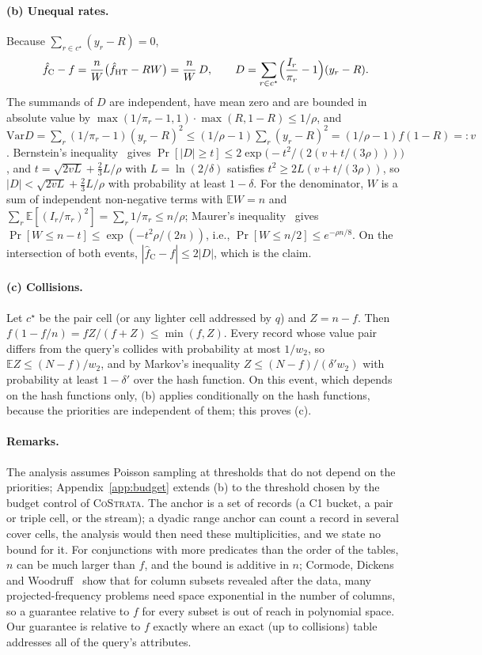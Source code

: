 \documentclass[sigconf,review,anonymous]{acmart}
\newcommand{\cs}{\textsc{CoStrata}\xspace}
\newcommand{\E}{\mathbb{E}}
\newcommand{\Var}{\mathrm{Var}}
\begin{document}
\paragraph{(b) Unequal rates.} Because $\sum_{r\in c^\star}(y_r-R)=0$,
\[
 \hat f_{\mathrm C}-f=\frac nW\bigl(\hat f_{\mathrm{HT}}-RW\bigr)=\frac nW\,D,\qquad
 D=\sum_{r\in c^\star}\Bigl(\frac{I_r}{\pi_r}-1\Bigr)(y_r-R).
\]
The summands of $D$ are independent, have mean zero and are bounded in absolute value by
$\max(1/\pi_r-1,1)\cdot\max(R,1-R)\le1/\rho$, and
$\Var D=\sum_r(1/\pi_r-1)(y_r-R)^2\le(1/\rho-1)\sum_r(y_r-R)^2=(1/\rho-1)f(1-R)=:v$. Bernstein's
inequality~\cite[Thm.~2.10]{concentration} gives $\Pr[|D|\ge t]\le2\exp\bigl(-t^2/(2(v+t/(3\rho)))\bigr)$,
and $t=\sqrt{2vL}+\frac23L/\rho$ with $L=\ln(2/\delta)$ satisfies $t^2\ge2L(v+t/(3\rho))$, so
$|D|<\sqrt{2vL}+\frac23L/\rho$ with probability at least $1-\delta$. For the denominator, $W$ is a sum of
independent non-negative terms with $\E W=n$ and $\sum_r\E[(I_r/\pi_r)^2]=\sum_r1/\pi_r\le n/\rho$;
Maurer's inequality~\cite{maurer} gives $\Pr[W\le n-t]\le\exp(-t^2\rho/(2n))$, i.e.,
$\Pr[W\le n/2]\le e^{-\rho n/8}$. On the intersection of both events, $|\hat f_{\mathrm C}-f|\le2|D|$,
which is the claim.

\paragraph{(c) Collisions.} Let $c^\star$ be the pair cell (or any lighter cell addressed by $q$) and
$Z=n-f$. Then $f(1-f/n)=fZ/(f+Z)\le\min(f,Z)$. Every record whose value pair differs from the query's
collides with probability at most $1/w_2$, so $\E Z\le(N-f)/w_2$, and by Markov's inequality
$Z\le(N-f)/(\delta'w_2)$ with probability at least $1-\delta'$ over the hash function. On this event,
which depends on the hash functions only, (b) applies conditionally on the hash functions, because the
priorities are independent of them; this proves (c).

\paragraph{Remarks.} The analysis assumes Poisson sampling at thresholds that do not depend on the
priorities; Appendix~\ref{app:budget} extends (b) to the threshold chosen by the budget control of \cs.
The anchor is a set of records (a C1 bucket, a pair or triple cell, or the stream); a dyadic range anchor
can count a record in several cover cells, the analysis would then need these multiplicities, and we
state no bound for it.
For conjunctions with more predicates than the order of the tables, $n$ can be much
larger than $f$, and the bound is additive in $n$; Cormode, Dickens and Woodruff~\cite{projfreq} show that
for column subsets revealed after the data, many projected-frequency problems need space exponential in
the number of columns, so a guarantee relative to $f$ for every subset is out of reach in polynomial
space. Our guarantee is relative to $f$ exactly where an exact (up to collisions) table addresses all of
the query's attributes.
\end{document}
